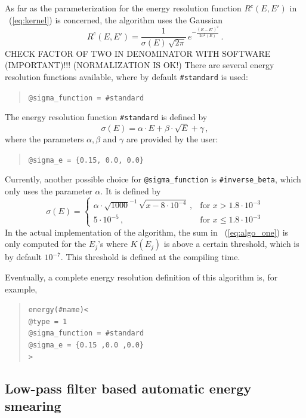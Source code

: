 As far as the parameterization for the energy resolution function 
$R^c(E,E')$ in \eq~(\ref{eq:kernel}) is concerned, the algorithm uses
the Gaussian
\begin{equation}
R^c(E,E')=\frac{1}{\sigma(E)\,\sqrt{2\pi}}\,e^{-\frac{(E-E')^2}{2\sigma^2(E)}} \, .
\end{equation} 
CHECK FACTOR OF TWO IN DENOMINATOR WITH SOFTWARE (IMPORTANT)!!! (NORMALIZATION IS OK!)
There are several energy resolution functions available, where by default
{\tt \#standard} is used:
\begin{quote}
{\tt \tb @sigma\_function = \#standard} 
\end{quote}
The energy resolution function {\tt \#standard} is defined by
\begin{equation}
\label{eq:sigma_e}
\sigma(E)=\alpha\cdot E + \beta \cdot \sqrt{E} +\gamma\, ,
\end{equation}
where the parameters $\alpha, \beta$ and $\gamma$ are provided by the user:
\begin{quote}
{\tt \tb @sigma\_e = \{0.15, 0.0, 0.0\}}
\end{quote}
Currently, another possible choice for {\tt @sigma\_function} is {\tt \#inverse\_beta},
which only uses the parameter $\alpha$. It is defined by
\begin{equation}
\sigma(E)= \left\{\begin{array}{cl}
 \alpha \cdot \sqrt{1000}^{-1}\,\sqrt{x-8\cdot10^{-4}}\,,&\mathrm{for}\,\, 
x>1.8\cdot10^{-3}\\
5\cdot10^{-5} \,,&\mathrm{for}\,\, x \leq 1.8\cdot10^{-3}
\end{array} \right.
\end{equation}
In the actual implementation of the algorithm,  the sum in \eq~(\ref{eq:algo_one}) is only computed for the $E_j$'s where $K(E_j)$ 
is above a certain threshold, which is by default $10^{-7}$. 
This threshold is defined at the compiling time. 

Eventually,  a complete energy resolution definition of this 
algorithm is, for example,
\begin{quote}
{\tt energy(\#name)<\\
\tb @type = 1\\
\tb @sigma\_function = \#standard\\
\tb @sigma\_e = \{0.15 ,0.0 ,0.0\}\\
>
}
\end{quote}

\subsection{Low-pass filter based automatic energy smearing}

